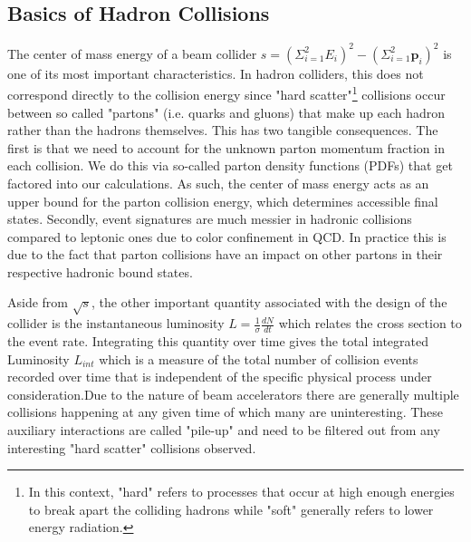 \subsection{Basics of Hadron Collisions}

The center of mass energy of a beam collider $s = (\Sigma^2_{i=1}E_i)^2 - (\Sigma^2_{i=1}\mathbf{p}_i)^2$ is 
one of its most important characteristics. In hadron colliders, this does not correspond directly to the collision 
energy since "hard scatter"\footnote{In this context, "hard" refers to processes that occur at high enough energies 
to break apart the colliding hadrons while "soft" generally refers to lower energy radiation.} collisions occur between 
so called "partons" (i.e. quarks and gluons) that make up each hadron rather than the hadrons themselves. This has 
two tangible consequences. The first is that we need to account for the unknown parton momentum fraction in 
each collision. We do this via so-called parton density functions (PDFs) that get factored into our calculations. As 
such, the center of mass energy acts as an upper bound for the parton collision energy, which determines 
accessible final states. Secondly, event signatures are much messier in hadronic collisions compared to leptonic 
ones due to color confinement in QCD. In practice this is due to the fact that parton collisions have an impact on 
other partons in their respective hadronic bound states. \par

Aside from $\sqrt{s}$, the other important quantity associated with the design of the 
collider is the instantaneous luminosity $L = \frac{1}{\sigma}\frac{dN}{dt}$ which relates the cross section to 
the event rate. Integrating this quantity over time gives the total integrated Luminosity $L_{int}$ which is a 
measure of the total number of collision events recorded over time that is independent of the specific 
physical process under consideration.Due to the nature of beam accelerators there are generally multiple 
collisions happening at any given time of which many are uninteresting. These auxiliary interactions are called 
"pile-up" and need to be filtered out from any interesting "hard scatter" collisions observed. \par

